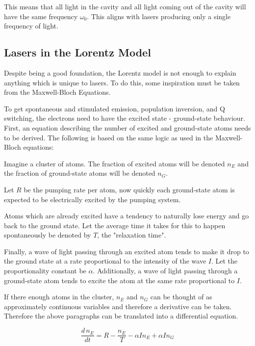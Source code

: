\documentclass[12pt]{article}
\begin{document}
This means that all light in the cavity and all light coming out of the cavity will have the same frequency $\omega_0$. This aligns with lasers producing only a single frequency of light.

\subsection{Lasers in the Lorentz Model}\label{sec:lorentz-laser}

Despite being a good foundation, the Lorentz model is not enough to explain anything which is unique to lasers. To do this, some inspiration must be taken from the Maxwell-Bloch Equations.

To get spontaneous and stimulated emission, population inversion, and Q switching, the electrons need to have the excited state - ground-state behaviour. First, an equation describing the number of excited and ground-state atoms needs to be derived. The following is based on the same logic as used in the Maxwell-Bloch equations:

\vspace{0.5cm}

\noindent Imagine a cluster of atoms. The fraction of excited atoms will be denoted $n_E$ and the fraction of ground-state atoms will be denoted $n_G$.

Let $R$ be the pumping rate per atom, now quickly each ground-state atom is expected to be electrically excited by the pumping system.

Atoms which are already excited have a tendency to naturally lose energy and go back to the ground state. Let the average time it takes for this to happen spontaneously be denoted by $T$, the "relaxation time".

Finally, a wave of light passing through an excited atom tends to make it drop to the ground state at a rate proportional to the intensity of the wave $I$. Let the proportionality constant be $\alpha$. Additionally, a wave of light passing through a ground-state atom tends to excite the atom at the same rate proportional to $I$.

If there enough atoms in the cluster, $n_E$ and $n_G$ can be thought of as approximately continuous variables and therefore a derivative can be taken. Therefore the above paragraphs can be translated into a differential equation.

\begin{equation}\label{eqn:excitement-diff}
    \frac{d\,n_E}{dt} = R - \frac{n_E}{T} - \alpha I n_E + \alpha I n_G
\end{equation}
\end{document}
